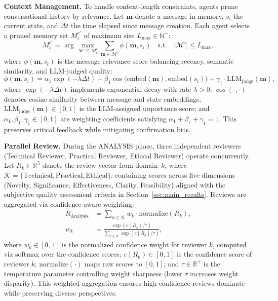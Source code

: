 \documentclass[runningheads]{llncs}
\begin{document}
\textbf{Context Management.} To handle context-length constraints, agents prune conversational history by relevance. Let $\mathbf{m}$ denote a message in memory, $s_i$ the current state, and $\Delta t$ the time elapsed since message creation. Each agent selects a pruned memory set $M_i^{c'}$ of maximum size $L_{\max} \in \mathbb{N}^+$:
\begin{equation}
    M_i^{c'} = \arg\max_{\mathcal{M}' \subseteq M_i^c} \sum_{\mathbf{m} \in \mathcal{M}'} \phi(\mathbf{m}, s_i) \quad \text{s.t.} \quad |\mathcal{M}'| \leq L_{\max},
\end{equation}
where $\phi(\mathbf{m}, s_i)$ is the message relevance score balancing recency, semantic similarity, and LLM-judged quality:
\begin{equation}
    \phi(\mathbf{m}, s_i) = \alpha_1 \exp(-\lambda \Delta t) + \beta_1 \cos\big(\text{embed}(\mathbf{m}), \text{embed}(s_i)\big) + \gamma_1 \cdot \text{LLM}_{\text{judge}}(\mathbf{m}),
\end{equation}
where $\exp(-\lambda \Delta t)$ implements exponential decay with rate $\lambda > 0$; $\cos(\cdot, \cdot)$ denotes cosine similarity between message and state embeddings; $\text{LLM}_{\text{judge}}(\mathbf{m}) \in [0, 1]$ is the LLM-assigned importance score; and $\alpha_1, \beta_1, \gamma_1 \in [0, 1]$ are weighting coefficients satisfying $\alpha_1 + \beta_1 + \gamma_1 = 1$. This preserves critical feedback while mitigating confirmation bias.

\textbf{Parallel Review.} During the ANALYSIS phase, three independent reviewers (Technical Reviewer, Practical Reviewer, Ethical Reviewer) operate concurrently. Let $R_k \in \mathbb{R}^5$ denote the review vector from domain~$k$, where $\mathcal{K} = \{\text{Technical}, \text{Practical}, \text{Ethical}\}$, containing scores across five dimensions (Novelty, Significance, Effectiveness, Clarity, Feasibility) aligned with the subjective quality assessment criteria in Section~\ref{sec:main_results}. Reviews are aggregated via confidence-aware weighting:
\begin{align}
    R_{\text{Analysis}} &= \sum_{k \in \mathcal{K}} w_k \cdot \text{normalize}(R_k), \\
    w_k &= \frac{\exp(c(R_k) / \tau)}{\sum_{j \in \mathcal{K}} \exp(c(R_j) / \tau)},
\end{align}
where $w_k \in [0, 1]$ is the normalized confidence weight for reviewer $k$, computed via softmax over the confidence scores; $c(R_k) \in [0, 1]$ is the confidence score of reviewer $k$; $\text{normalize}(\cdot)$ maps raw scores to $[0, 1]$; and $\tau \in \mathbb{R}^+$ is the temperature parameter controlling weight sharpness (lower $\tau$ increases weight disparity). This weighted aggregation ensures high-confidence reviews dominate while preserving diverse perspectives.
\end{document}
